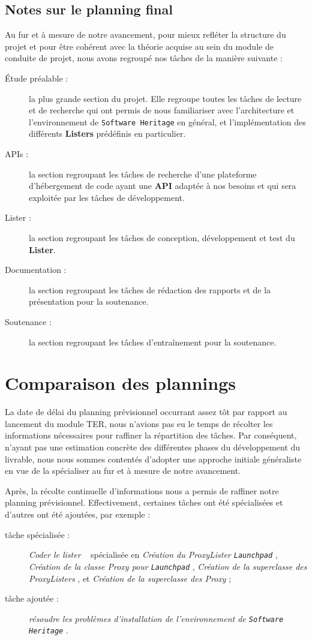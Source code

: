 \documentclass[12pt,a4paper]{report}
\begin{document}
\subsection{Notes sur le planning final}
Au fur et à mesure de notre avancement, pour mieux refléter la structure du projet et pour être cohérent avec la théorie acquise au sein du module de conduite de projet, nous avons regroupé nos tâches de la manière suivante :
\begin{description}
  \item [Étude préalable :] la plus grande section du projet. Elle regroupe toutes les tâches de lecture et de recherche qui ont permis de nous familiariser avec l'architecture et l'environnement de \texttt{Software Heritage} en général, et l'implémentation des différents \textbf{Listers} prédéfinis en particulier.
  \item [APIs :] la section regroupant les tâches de recherche d'une plateforme d'hébergement de code ayant une \textbf{API} adaptée à nos besoins et qui sera exploitée par les tâches de développement.
  \item [Lister :] la section regroupant les tâches de conception, développement et test du \textbf{Lister}.
  \item [Documentation :] la section regroupant les tâches de rédaction des rapports et de la présentation pour la soutenance.
  \item [Soutenance :] la section regroupant les tâches d'entraînement pour la soutenance.
\end{description}

\section{Comparaison des plannings}
La date de délai du planning prévisionnel occurrant assez tôt par rapport au lancement du module TER, nous n'avions pas eu le temps de récolter les informations nécessaires pour raffiner la répartition des tâches. Par conséquent, n'ayant pas une estimation concrète des différentes phases du développement du livrable, nous nous sommes contentés d'adopter une approche initiale généraliste en vue de la spécialiser au fur et à mesure de notre avancement.

Après, la récolte continuelle d'informations nous a permis de raffiner notre planning prévisionnel. Effectivement, certaines tâches ont été spécialisées et d'autres ont été ajoutées, par exemple :
\begin{description}
  \item [tâche spécialisée :] \og \textit{Coder le lister} \fg~ spécialisée en \og \textit{Création du ProxyLister \texttt{Launchpad}} \fg , \og \textit{Création de la classe Proxy pour \texttt{Launchpad}} \fg, \og \textit{Création de la superclasse des ProxyListers} \fg, et \og \textit{Création de la superclasse des Proxy} \fg ;
  \item [tâche ajoutée :] \og \textit{résoudre les problèmes d'installation de l'environnement de \texttt{Software Heritage}} \fg.
\end{description}
\end{document}
